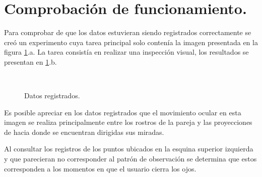\documentclass[\main/main.tex]{subfiles}
\begin{document}
    \section{Comprobación de funcionamiento.}
    \label{sec:04_resultados}
        Para comprobar de que los datos estuvieran siendo registrados correctamente se creó un experimento cuya tarea principal solo contenía la imagen presentada en la figura \ref{fig:04_frame_result}.a. La tarea consistía en realizar una inspección visual, los resultados se presentan en \ref{fig:04_frame_result}.b.

        \begin{figure}[H]
            \centering
            \\
            \hspace{5mm}
            \caption{Datos registrados.}
            \label{fig:04_frame_result}
        \end{figure}

        Es posible apreciar en los datos registrados que el movimiento ocular en esta imagen se realiza principalmente entre los rostros de la pareja y las proyecciones de hacia donde se encuentran dirigidas sus miradas.

        Al consultar los registros de los puntos ubicados en la esquina superior izquierda y que parecieran no corresponder al patrón de observación se determina que estos corresponden a los momentos en que el usuario cierra los ojos.    
\end{document}

